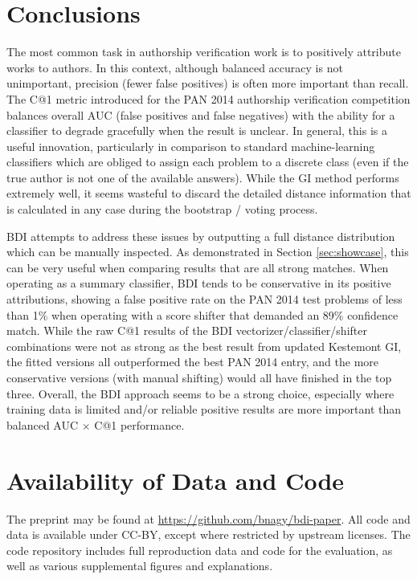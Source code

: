 \documentclass[
    hf
]{ceurart}
\begin{document}
\section{Conclusions}

The most common task in authorship verification work is to positively attribute works to authors. In
this context, although balanced accuracy is not unimportant, precision (fewer false positives) is
often more important than recall. The C@1 metric introduced for the PAN 2014 authorship verification
competition balances overall AUC (false positives and false negatives) with the ability for a
classifier to degrade gracefully when the result is unclear. In general, this is a useful
innovation, particularly in comparison to standard machine-learning classifiers which are obliged to
assign each problem to a discrete class (even if the true author is not one of the available
answers). While the GI method performs extremely well, it seems wasteful to discard the detailed
distance information that is calculated in any case during the bootstrap / voting process.

BDI attempts to address these issues by outputting a full distance distribution which can be
manually inspected. As demonstrated in Section \ref{sec:showcase}, this can be very useful when
comparing results that are all strong matches. When operating as a summary classifier, BDI tends to
be conservative in its positive attributions, showing a false positive rate on the PAN 2014 test
problems of less than 1\% when operating with a score shifter that demanded an 89\% confidence
match. While the raw C@1 results of the BDI vectorizer/classifier/shifter combinations were not as
strong as the best result from updated Kestemont GI, the fitted versions all outperformed the best
PAN 2014 entry, and the more conservative versions (with manual shifting) would all have finished in
the top three. Overall, the BDI approach seems to be a strong choice, especially where training data
is limited and/or reliable positive results are more important than balanced AUC $\times$ C@1
performance.

\section{Availability of Data and Code}\label{sec:data}

The preprint may be found at \url{https://github.com/bnagy/bdi-paper}. All code and data is
available under CC-BY, except where restricted by upstream licenses. The code repository includes
full reproduction data and code for the evaluation, as well as various supplemental figures and
explanations.
\end{document}
